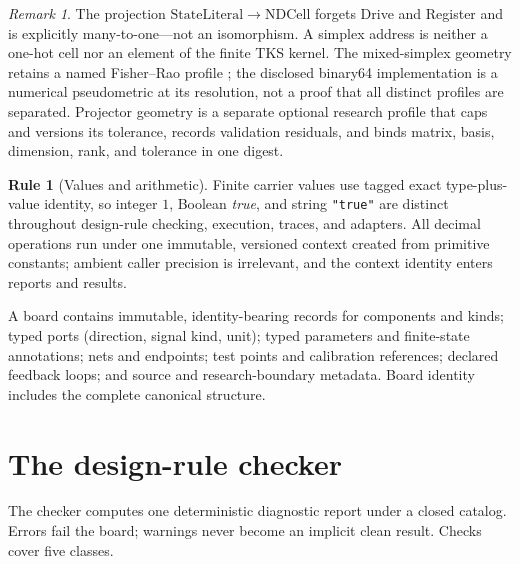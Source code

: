 \documentclass[11pt]{amsart}
\theoremstyle{definition}
\newtheorem{ruleenv}[theorem]{Rule}
\theoremstyle{remark}
\newtheorem{remark}[theorem]{Remark}
\begin{document}
\begin{remark}
The projection $\mathrm{StateLiteral}\to\mathrm{NDCell}$ forgets Drive and Register and is explicitly many-to-one---not an isomorphism. A simplex address is neither a one-hot cell nor an element of the finite TKS kernel. The mixed-simplex geometry retains a named Fisher--Rao profile \cite{amari}; the disclosed binary64 implementation is a numerical pseudometric at its resolution, not a proof that all distinct profiles are separated. Projector geometry is a separate optional research profile that caps and versions its tolerance, records validation residuals, and binds matrix, basis, dimension, rank, and tolerance in one digest.
\end{remark}

\begin{ruleenv}[Values and arithmetic]
Finite carrier values use tagged exact type-plus-value identity, so integer $1$, Boolean \emph{true}, and string \texttt{"true"} are distinct throughout design-rule checking, execution, traces, and adapters. All decimal operations run under one immutable, versioned context created from primitive constants; ambient caller precision is irrelevant, and the context identity enters reports and results.
\end{ruleenv}

A board contains immutable, identity-bearing records for components and kinds; typed ports (direction, signal kind, unit); typed parameters and finite-state annotations; nets and endpoints; test points and calibration references; declared feedback loops; and source and research-boundary metadata. Board identity includes the complete canonical structure.

\section{The design-rule checker}

The checker computes one deterministic diagnostic report under a closed catalog. Errors fail the board; warnings never become an implicit clean result. Checks cover five classes.
\end{document}
